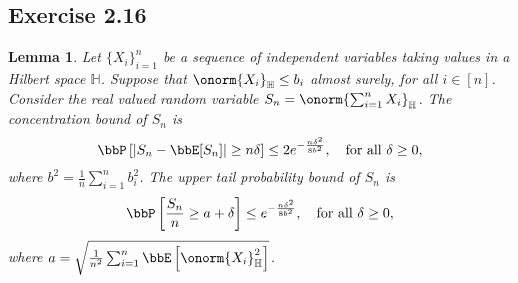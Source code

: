 \documentclass[11pt]{article}
\newcommand{\off}[1]{\left[#1\right]}
\theoremstyle{plain}
\newtheorem{lem}{Lemma}
\theoremstyle{definition}
\begin{document}
	
    \subsection{Exercise 2.16}
    \begin{lem}
    	Let $\{X_i\}_{i=1}^n$ be a sequence of independent variables taking values in a Hilbert space $\mathbb{H}$. Suppose that $\onorm{X_i}_{\mathbb{H}} \leq b_i$ almost surely, for all $i \in [n]$. Consider the real valued random variable $S_n = \onorm{\sum_{i=1}^n X_i}_{\mathbb{H}}$. The concentration bound of $S_n$ is
    	\begin{equation}\label{eq:e216a}
    		\bbP\off{|S_n - \bbE[S_n]| \geq n\delta} \leq 2e^{-\frac{n\delta^2}{8b^2}}, \quad \text{for all } \delta \geq 0,
    	\end{equation}
    	where $b^2 = \frac{1}{n} \sum_{i=1}^n b_i^2$. The upper tail probability bound of $S_n$ is
    	\begin{equation}\label{eq:e216b}
    		\bbP \off{\frac{S_n}{n} \geq a + \delta} \leq e^{-\frac{n\delta^2}{8b^2}}, \quad \text{for all }\delta \geq 0,
    	\end{equation}
    	where $a = \sqrt{\frac{1}{n^2} \sum_{i=1}^n \bbE \off{\onorm{X_i}^2_{\mathbb{H}}} }$.
    \end{lem} 
    
\end{document}
